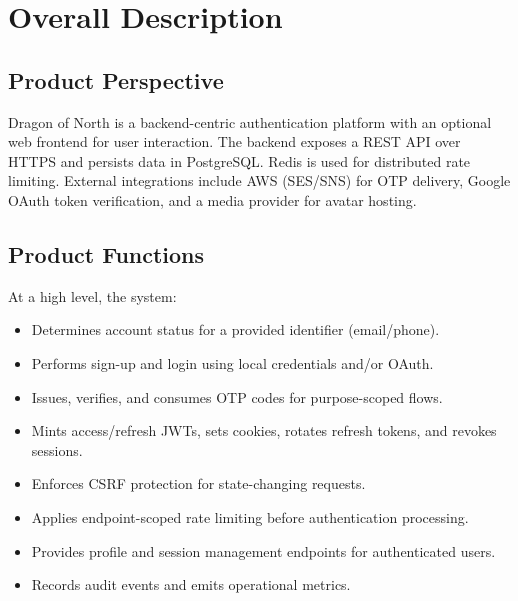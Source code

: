 \documentclass[11pt]{article}
\newcommand{\ProductName}{Dragon of North}
\begin{document}


    \section{Overall Description}\label{sec:overall}

    \subsection{Product Perspective}
    \ProductName{} is a backend-centric authentication platform with an optional web frontend for user interaction. The backend exposes a REST API over HTTPS and persists data in PostgreSQL. Redis is used for distributed rate limiting. External integrations include AWS (SES/SNS) for OTP delivery, Google OAuth token verification, and a media provider for avatar hosting.

    \subsection{Product Functions}
    At a high level, the system:
    \begin{itemize}
        \item Determines account status for a provided identifier (email/phone).
        \item Performs sign-up and login using local credentials and/or OAuth.
        \item Issues, verifies, and consumes OTP codes for purpose-scoped flows.
        \item Mints access/refresh JWTs, sets cookies, rotates refresh tokens, and revokes sessions.
        \item Enforces CSRF protection for state-changing requests.
        \item Applies endpoint-scoped rate limiting before authentication processing.
        \item Provides profile and session management endpoints for authenticated users.
        \item Records audit events and emits operational metrics.
    \end{itemize}
\end{document}
